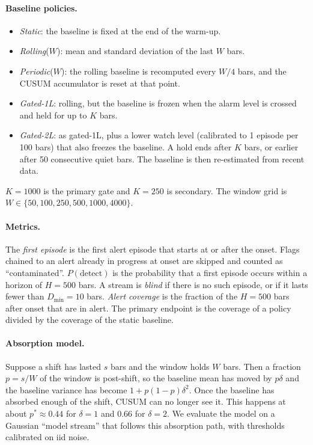 \documentclass[11pt]{article}
\begin{document}
\paragraph{Baseline policies.}
\begin{itemize}
\item \emph{Static}: the baseline is fixed at the end of the warm-up.
\item \emph{Rolling}($W$): mean and standard deviation of the last $W$ bars.
\item \emph{Periodic}($W$): the rolling baseline is recomputed every $W/4$ bars, and the CUSUM accumulator is reset at that point.
\item \emph{Gated-1L}: rolling, but the baseline is frozen when the alarm level is crossed and held for up to $K$ bars.
\item \emph{Gated-2L}: as gated-1L, plus a lower watch level (calibrated to 1 episode per 100 bars) that also freezes the baseline. A hold ends after $K$ bars, or earlier after 50 consecutive quiet bars. The baseline is then re-estimated from recent data.
\end{itemize}
$K=1000$ is the primary gate and $K=250$ is secondary. The window grid is $W\in\{50,100,250,500,1000,4000\}$.

\paragraph{Metrics.} The \emph{first episode} is the first alert episode that starts at or after the onset. Flags chained to an alert already in progress at onset are skipped and counted as ``contaminated''. $P(\text{detect})$ is the probability that a first episode occurs within a horizon of $H=500$ bars. A stream is \emph{blind} if there is no such episode, or if it lasts fewer than $D_{\min}=10$ bars. \emph{Alert coverage} is the fraction of the $H=500$ bars after onset that are in alert. The primary endpoint is the coverage of a policy divided by the coverage of the static baseline.

\paragraph{Absorption model.} Suppose a shift has lasted $s$ bars and the window holds $W$ bars. Then a fraction $p=s/W$ of the window is post-shift, so the baseline mean has moved by $p\delta$ and the baseline variance has become $1+p(1-p)\delta^2$. Once the baseline has absorbed enough of the shift, CUSUM can no longer see it. This happens at about $p^\ast\approx 0.44$ for $\delta=1$ and $0.66$ for $\delta=2$. We evaluate the model on a Gaussian ``model stream'' that follows this absorption path, with thresholds calibrated on iid noise.
\end{document}
